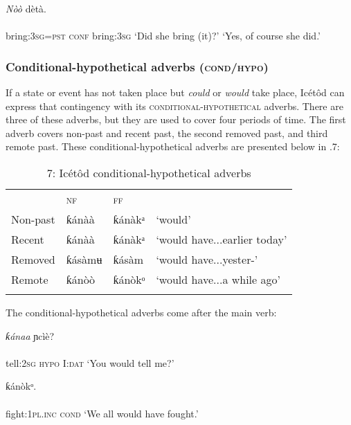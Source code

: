 \ea\label{ex:}
      \textit{Nòò}   dètà. \\
    \\
bring:\textsc{3sg=pst}    \textsc{conf}   bring:\textsc{3sg}
\glt ‘Did she bring (it)?’    ‘Yes, of course she did.’ 
\z




\subsubsection{Conditional-hypothetical adverbs (\textsc{cond}/\textsc{hypo})}

If a state or event has not taken place but \textit{could} or \textit{would} take place, Icétôd can express that contingency with its \textsc{conditional-hypothetical} adverbs. There are three of these adverbs, but they are used to cover four periods of time. The first adverb covers non-past and recent past, the second removed past, and third remote past. These conditional-hypothetical adverbs are presented below in .7:


\begin{table}
\caption{7: Icétôd conditional-hypothetical adverbs}
\label{tab:9}


\begin{tabularx}{\textwidth}{XXXX} & \textsc{nf} & \textsc{ff} & \\
\lsptoprule
Non-past & ƙánàà & ƙánàkᵃ & ‘would’\\
Recent & ƙánàà & ƙánàkᵃ & ‘would have...earlier today’\\
Removed & ƙásàmʉ & ƙásàm & ‘would have...yester-’\\
Remote & ƙánòò & ƙánòkᵒ & ‘would have...a while ago’\\
\lspbottomrule
\end{tabularx}
\end{table}
The conditional-hypothetical adverbs come after the main verb:




\ea\label{ex:}
     \textit{ƙánaa}   ɲcìè? \\
    \\
tell:\textsc{2sg}   \textsc{hypo}     I:\textsc{dat}
\glt ‘You would tell me?’ 
\z




\ea\label{ex:}
   ƙánòkᵒ. \\
    \\
fight:\textsc{1pl.inc cond}
\glt ‘We all would have fought.’ 
\z





